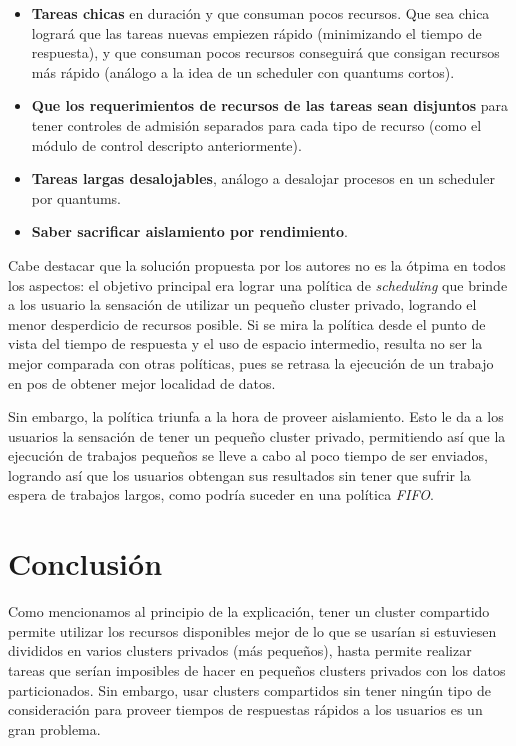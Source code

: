 \documentclass[a4paper]{article}
\begin{document}
\begin{itemize}
  \item \textbf{Tareas chicas} en duración y que consuman pocos recursos. Que
  sea chica logrará que las tareas nuevas empiezen rápido (minimizando el
  tiempo de respuesta), y que consuman pocos recursos conseguirá que consigan
  recursos más rápido (análogo a la idea de un scheduler con quantums cortos).
  \item \textbf{Que los requerimientos de recursos de las tareas sean
  disjuntos} para tener controles de admisión separados para cada tipo de
  recurso (como el módulo de control descripto anteriormente).
  \item \textbf{Tareas largas desalojables}, análogo a desalojar procesos en un
  scheduler por quantums.
  \item \textbf{Saber sacrificar aislamiento por rendimiento}.
\end{itemize}

Cabe destacar que la solución propuesta por los autores no es la ótpima en
todos los aspectos: el objetivo principal era lograr una política de
\textit{scheduling} que brinde a los usuario la sensación de utilizar un
pequeño cluster privado, logrando el menor desperdicio de recursos posible. Si
se mira la política desde el punto de vista del tiempo de respuesta y el uso de
espacio intermedio, resulta no ser la mejor comparada con otras políticas, pues
se retrasa la ejecución de un trabajo en pos de obtener mejor localidad de
datos.

Sin embargo, la política triunfa a la hora de proveer aislamiento. Esto le da a
los usuarios la sensación de tener un pequeño cluster privado, permitiendo así
que la ejecución de trabajos pequeños se lleve a cabo al poco tiempo de ser
enviados, logrando así que los usuarios obtengan sus resultados sin tener que
sufrir la espera de trabajos largos, como podría suceder en una política
\textit{FIFO}.


\newpage
\section{Conclusión}
Como mencionamos al principio de la explicación, tener un cluster compartido
permite utilizar los recursos disponibles mejor de lo que se usarían si
estuviesen divididos en varios clusters privados (más pequeños), hasta permite
realizar tareas que serían imposibles de hacer en pequeños clusters privados
con los datos particionados. Sin embargo, usar clusters compartidos sin tener
ningún tipo de consideración para proveer tiempos de respuestas rápidos a los
usuarios es un gran problema.
\end{document}
